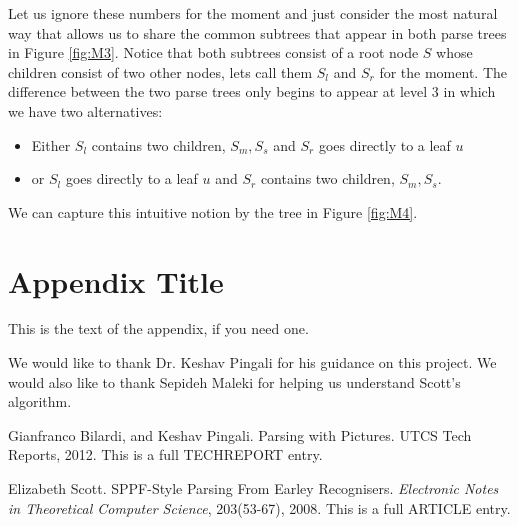 \documentclass{sigplanconf}
\begin{document}
Let us ignore these numbers for the moment and just consider the most natural way that allows us to share the common subtrees that appear in both parse trees in Figure \ref{fig:M3}. Notice that both subtrees consist of a root node $S$ whose children consist of two other nodes, lets call them $S_l$ and $S_r$ for the moment. The difference between the two parse trees only begins to appear at level $3$ in which we have two alternatives:
\begin{itemize}
\item Either $S_l$ contains two children, $S_m,S_s$ and $S_r$ goes directly to a leaf $u$
\item or $S_l$ goes directly to a leaf $u$ and $S_r$ contains two children, $S_m,S_s$.
\end{itemize}
We can capture this intuitive notion by the tree in Figure \ref{fig:M4}.
\appendix
\section{Appendix Title}

This is the text of the appendix, if you need one.

\acks
We would like to thank Dr. Keshav Pingali for his guidance on this project. We would also like to thank Sepideh Maleki for helping us understand Scott's algorithm.





\begin{thebibliography}{}
\softraggedright

Gianfranco Bilardi, and Keshav Pingali. Parsing with Pictures. UTCS Tech Reports, 2012. This is a full TECHREPORT entry.

Elizabeth Scott. SPPF-Style Parsing From Earley Recognisers. \textit{Electronic Notes in Theoretical Computer Science}, 203(53-67), 2008. This is a full ARTICLE entry.

\end{thebibliography}
\end{document}
